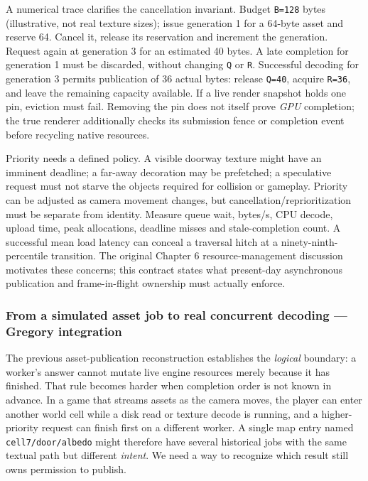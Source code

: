 A numerical trace clarifies the cancellation invariant. Budget \texttt{B=128} bytes (illustrative, not real texture sizes); issue generation 1 for a 64-byte asset and reserve 64. Cancel it, release its reservation and increment the generation. Request again at generation 3 for an estimated 40 bytes. A late completion for generation 1 must be discarded, without changing \texttt{Q} or \texttt{R}. Successful decoding for generation 3 permits publication of 36 actual bytes: release \texttt{Q=40}, acquire \texttt{R=36}, and leave the remaining capacity available. If a live render snapshot holds one pin, eviction must fail. Removing the pin does not itself prove \emph{GPU} completion; the true renderer additionally checks its submission fence or completion event before recycling native resources.

Priority needs a defined policy. A visible doorway texture might have an imminent deadline; a far-away decoration may be prefetched; a speculative request must not starve the objects required for collision or gameplay. Priority can be adjusted as camera movement changes, but cancellation/reprioritization must be separate from identity. Measure queue wait, bytes/s, CPU decode, upload time, peak allocations, deadline misses and stale-completion count. A successful mean load latency can conceal a traversal hitch at a ninety-ninth-percentile transition. The original Chapter 6 resource-management discussion motivates these concerns; this contract states what present-day asynchronous publication and frame-in-flight ownership must actually enforce.

\subsubsection{From a simulated asset job to real concurrent decoding --- Gregory integration}\label{06-engine-ii-ch027-from-a-simulated-asset-job-to-real-concurrent-decoding-gregory-integration}

The previous asset-publication reconstruction establishes the \emph{logical} boundary: a worker's answer cannot mutate live engine resources merely because it has finished. That rule becomes harder when completion order is not known in advance. In a game that streams assets as the camera moves, the player can enter another world cell while a disk read or texture decode is running, and a higher-priority request can finish first on a different worker. A single map entry named \texttt{cell7/door/albedo} might therefore have several historical jobs with the same textual path but different \emph{intent}. We need a way to recognize which result still owns permission to publish.

